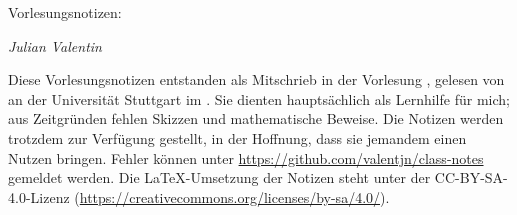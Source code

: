 

\ihead{\vorlesung{}}
\ifoot{\vspace{-1.5mm}\headmark}

\thispagestyle{empty}
\vspace*{1em}

{%
  \huge%
  Vorlesungsnotizen: \vorlesung{}%
}
\vspace*{1em}

\emph{Julian Valentin}

\vspace*{1em}

Diese Vorlesungsnotizen entstanden als Mitschrieb in der Vorlesung \vorlesung{},
gelesen von \dozent{} an der Universität Stuttgart im \semester{}.
Sie dienten hauptsächlich als Lernhilfe für mich;
aus Zeitgründen fehlen Skizzen und mathematische Beweise.
Die Notizen werden trotzdem zur Verfügung gestellt, in der Hoffnung,
dass sie jemandem einen Nutzen bringen.
Fehler können unter \url{https://github.com/valentjn/class-notes} gemeldet werden.
Die \LaTeX{}-Umsetzung der Notizen steht unter der CC-BY-SA-4.0-Lizenz
(\url{https://creativecommons.org/licenses/by-sa/4.0/}).

\tableofcontents
\pagebreak


